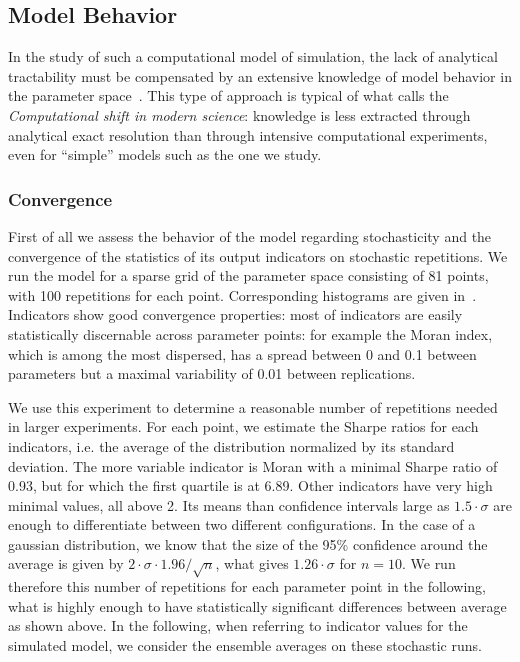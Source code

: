 \documentclass[10pt,letterpaper]{article}
\begin{document}
\subsection*{Model Behavior}


In the study of such a computational model of simulation, the lack of analytical tractability must be compensated by an extensive knowledge of model behavior in the parameter space~\cite{banos2013pour}. This type of approach is typical of what \cite{arthur2015complexity} calls the \emph{Computational shift in modern science}: knowledge is less extracted through analytical exact resolution than through intensive computational experiments, even for ``simple'' models such as the one we study.


\subsubsection*{Convergence}

First of all we assess the behavior of the model regarding stochasticity and the convergence of the statistics of its output indicators on stochastic repetitions. We run the model for a sparse grid of the parameter space consisting of 81 points, with 100 repetitions for each point. Corresponding histograms are given in~. Indicators show good convergence properties: most of indicators are easily statistically discernable across parameter points: for example the Moran index, which is among the most dispersed, has a spread between 0 and 0.1 between parameters but a maximal variability of 0.01 between replications.


We use this experiment to determine a reasonable number of repetitions needed in larger experiments. For each point, we estimate the Sharpe ratios for each indicators, i.e. the average of the distribution normalized by its standard deviation. The more variable indicator is Moran with a minimal Sharpe ratio of 0.93, but for which the first quartile is at 6.89. Other indicators have very high minimal values, all above 2. Its means than confidence intervals large as $1.5 \cdot \sigma$ are enough to differentiate between two different configurations. In the case of a gaussian distribution, we know that the size of the 95\% confidence around the average is given by $2\cdot \sigma \cdot 1.96 / \sqrt{n}$, what gives $1.26 \cdot \sigma$ for $n=10$. We run therefore this number of repetitions for each parameter point in the following, what is highly enough to have statistically significant differences between average as shown above. In the following, when referring to indicator values for the simulated model, we consider the ensemble averages on these stochastic runs.
\end{document}
